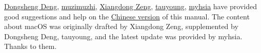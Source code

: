 \href{https://github.com/EthanDeng}{Dongsheng Deng},
\href{https://github.com/muzimuzhi}{muzimuzhi},
\href{https://github.com/stone-zeng}{Xiangdong Zeng},
\href{https://github.com/taumasyang}{tauyoung},
\href{https://github.com/myhsia}{myhsia}
have provided good suggestions and help on the
\href{https://github.com/OsbertWang/install-latex-zh-cn}{Chinese version}
of this manual.
The content about macOS was originally drafted by Xiangdong Zeng,
supplemented by Dongsheng Deng, tauyoung,
and the latest update was provided by myhsia.
Thanks to them.

